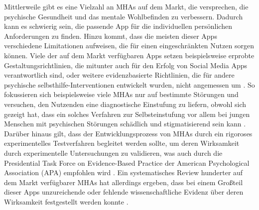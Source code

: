 Mittlerweile gibt es eine Vielzahl an MHAs auf dem Markt, die versprechen, die psychische Gesundheit 
und das mentale Wohlbefinden zu verbessern. Dadurch kann es schwierig sein, 
die passende App für die individuellen persönlichen Anforderungen zu finden. Hinzu kommt, 
dass die meisten dieser Apps verschiedene Limitationen aufweisen, die für einen eingeschränkten Nutzen sorgen können.
Viele der auf dem Markt verfügbaren Apps setzen beispielsweise erprobte Gestaltungsrichtlinien, 
die mitunter auch für den Erfolg von Social Media Apps verantwortlich sind, oder weitere evidenzbasierte Richtlinien, 
die für andere psychische selbsthilfe-Interventionen entwickelt wurden, nicht angemessen um 
\cite[]{bakker_mental_2016}. %
So fokussieren sich beispielsweise viele MHAs nur auf bestimmte Störungen und versuchen, 
den Nutzenden eine diagnostische Einstufung zu liefern, obwohl sich gezeigt hat, dass ein solches Verfahren zur 
Selbsteinstufung vor allem bei jungen Menschen mit psychischen Störungen schädlich und stigmatisierend sein kann 
\cite[]{bakker_mental_2016,moses_self-labeling_2009}. \\ %
Darüber hinaus gilt, dass der Entwicklungsprozess von MHAs durch ein rigoroses experimentelles Testverfahren 
begleitet werden sollte, um deren Wirksamkeit durch experimentelle Untersuchungen zu validieren, 
was auch durch die Presidential Task Force on Evidence-Based Practice der American Psychological Association (APA) 
empfohlen wird \cite[]{bakker_mental_2016,american_psychological_association_evidence-based_2006}. 
Ein systematisches Review hunderter auf dem Markt verfügbarer MHAs hat allerdings ergeben, 
dass bei einem Großteil dieser Apps unzureichende oder fehlende wissenschaftliche Evidenz über deren Wirksamkeit 
festgestellt werden konnte \cite[]{donker_smartphones_2013}. %

